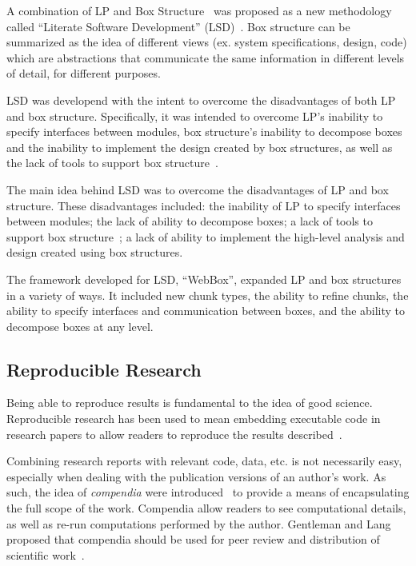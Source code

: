 \documentclass{article}
\begin{document}
A combination of LP and Box Structure~\cite{Mills1986} was proposed as a new methodology called ``Literate Software Development'' (LSD)~\cite{AlMatiiAndBoujarwah2002}. Box structure can be summarized as the idea of different views (ex. system specifications, design, code) which are abstractions that communicate the same information in different levels of detail, for different purposes.

LSD was developend with the intent to overcome the disadvantages of both LP and box structure. Specifically, it was intended to overcome LP's inability to specify interfaces between modules, box structure's inability to decompose boxes and the inability to implement the design created by box structures, as well as the lack of tools to support box structure~\cite{Deck1996}. 

The main idea behind LSD was to overcome the disadvantages of LP and box
structure. These disadvantages included: the inability of LP to specify
interfaces between modules; the lack of ability to decompose boxes; a lack of
tools to support box structure~\cite{Deck1996}; a lack of ability to implement
the high-level analysis and design created using box structures.

The framework developed for LSD, ``WebBox'', expanded LP and box structures in a variety of ways. It included new chunk types, the ability to refine chunks, the ability to specify interfaces and communication between boxes, and the ability to decompose boxes at any level.

\subsection{Reproducible Research}

Being able to reproduce results is fundamental to the idea of good science. Reproducible research has been used to mean embedding executable code in research papers to allow readers to reproduce the results described~\cite{SchulteEtAl2012}. 

Combining research reports with relevant code, data, etc. is not necessarily easy, especially when dealing with the publication versions of an author's work. As such, the idea of \emph{compendia} were introduced~\cite{GentlemanAndLang2012} to provide a means of encapsulating the full scope of the work. Compendia allow readers to see computational details, as well as re-run computations performed by the author. Gentleman and Lang proposed that compendia should be used for peer review and distribution of scientific work~\cite{GentlemanAndLang2012}.
\end{document}
